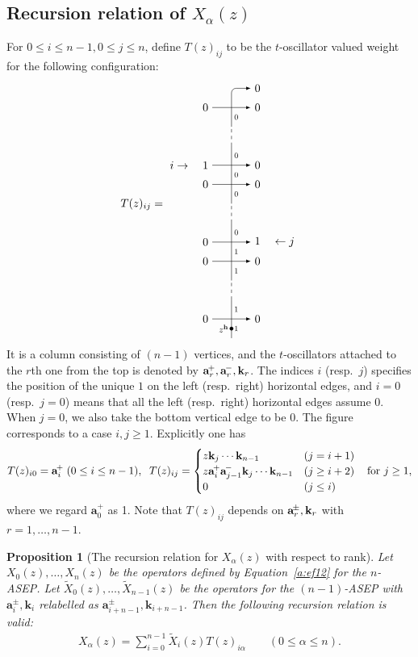 \documentclass[11pt]{article}
\newtheorem{prop}[theo]{Proposition}
\theoremstyle{definition}
\numberwithin{equation}{section}
\newcommand{\am}{{\rm\aaa}^{\!-} }
\newcommand{\ap}{{\rm\aaa}^{\!+} }
\newcommand{\apm}{{\rm\aaa}^{\!\pm} }
\newcommand{\aaa}{\mathbf{a}}
\newcommand{\hh}{\mathbf{h}}
\newcommand{\kk}{\mathbf{k}}
\begin{document}
\subsection{Recursion relation of \texorpdfstring{$X_\alpha(z)$}{X\_a(z)}}

For $0\le i\le n-1,0\le j\le n$, define $T(z)_{ij}$ to be the $t$-oscillator valued weight for the following configuration:
\begin{equation}
T(z)_{ij} = 
\begin{tikzpicture}[scale=.6,>=latex, baseline=3.5cm]
\draw[-] (0,-1) -- (0,1);
\draw[-] (0,2) -- (0,5);
\draw[-] (0,6) -- (0,9);
\draw[->,rounded corners] (0,10) -- (0,12) -- (1,12) node[anchor=west] {$0$};
\foreach \y in {1,5,9}
	\draw[dashed] (0,\y) -- (0,\y+1);
\foreach \y in {0,3,7,11}
	\draw[->] (-1,\y) node[anchor=east] {$0$} -- (1,\y) node[anchor=west] {$0$};
\draw[->] (-1,4) node[anchor=east] {$0$} -- (1,4) node[anchor=west] {$1 \quad \leftarrow j$};
\draw[->] (-1,8) node[anchor=east] {$i \rightarrow \quad 1$} -- (1,8) node[anchor=west] {$0$};
\fill[black] (0,-.5) circle (.1) node[anchor=east, scale=.8] {$z^{\hh}$};
\foreach \y in {0,1,3,4}
	\draw (0,\y-.5) node[anchor=west, scale=.7] {$1$};
\foreach \y in {5,7,8,9,11}
	\draw (0,\y-.5) node[anchor=west, scale=.7] {$0$};
\end{tikzpicture}
\end{equation}
It is a column consisting of $(n-1)$ vertices, and the $t$-oscillators attached to the $r$th one from the top is 
denoted by $\ap_r, \am_r, \kk_r$. 
The indices $i$ (resp.\ $j$) specifies the position of the unique $1$ on the left (resp.\ right) 
horizontal edges, and $i=0$ (resp.\ $j=0$) means that all the left (resp.\ right) horizontal edges assume $0$. 
When $j = 0$, we also take the bottom vertical edge to be $0$.
The figure corresponds to a case $i,j \ge 1$.
Explicitly one has 
%
\begin{equation}\label{a:Tdef}
T(z)_{i0}=
\ap_i \; (0 \le i \le n-1), \;\;
T(z)_{ij} = \begin{cases}
z\kk_j\cdots \kk_{n-1}&(j=i+1)\\
z\ap_i\am_{j-1}\kk_j\cdots \kk_{n-1}&(j\ge i+2)\\
0&(j\le i)
\end{cases}
\;\;\text{ for }j\ge1,
\end{equation}
where we regard $\aaa^+_0$ as 1.
%
Note that $T(z)_{ij}$ depends on $\apm_r, \kk_r$ with $r=1,\ldots, n-1$.


\begin{prop}[The recursion relation for $X_\alpha(z)$ with respect to rank] \label{a:pr:rt}
Let $X_0(z), \ldots, X_n(z)$ be the operators defined by Equation~\eqref{a:ef12} for the $n$-ASEP.
Let $\widetilde{X}_0(z), \ldots, \widetilde{X}_{n-1}(z)$ be the operators for the $(n-1)$-ASEP with 
$\aaa^\pm_i, \kk_i$ relabelled as $\aaa^\pm_{i+n-1}, \kk_{i+n-1}$.
Then the following recursion relation is valid:
\begin{align}\label{a:xxt}
X_\alpha(z) = \sum_{i=0}^{n-1}\widetilde{X}_i(z) T(z)_{i\alpha}\qquad (0 \le \alpha \le n).
\end{align}
\end{prop}
\end{document}
